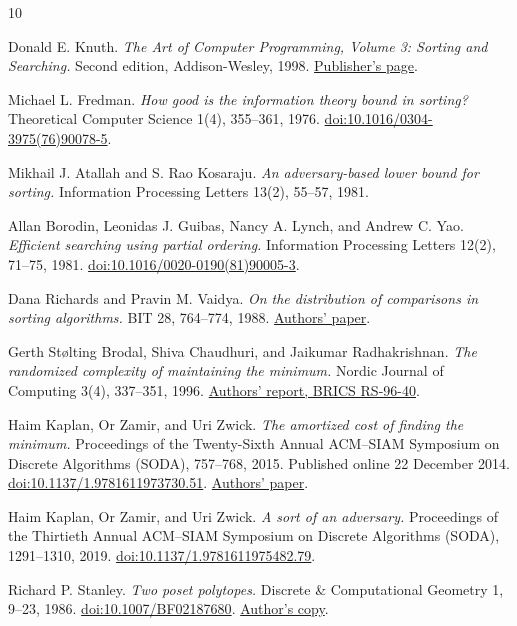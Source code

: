 \begin{thebibliography}{10}

Donald E. Knuth.
\emph{The Art of Computer Programming, Volume 3: Sorting and Searching.}
Second edition, Addison-Wesley, 1998.
\href{https://www.informit.com/store/art-of-computer-programming-volume-3-sorting-and-searching-9780201896855}{Publisher's page}.

Michael L. Fredman.
\emph{How good is the information theory bound in sorting?}
Theoretical Computer Science 1(4), 355--361, 1976.
\href{https://doi.org/10.1016/0304-3975(76)90078-5}{doi:10.1016/0304-3975(76)90078-5}.

Mikhail J. Atallah and S. Rao Kosaraju.
\emph{An adversary-based lower bound for sorting.}
Information Processing Letters 13(2), 55--57, 1981.

Allan Borodin, Leonidas J. Guibas, Nancy A. Lynch, and Andrew C. Yao.
\emph{Efficient searching using partial ordering.}
Information Processing Letters 12(2), 71--75, 1981.
\href{https://doi.org/10.1016/0020-0190(81)90005-3}{doi:10.1016/0020-0190(81)90005-3}.

Dana Richards and Pravin M. Vaidya.
\emph{On the distribution of comparisons in sorting algorithms.}
BIT 28, 764--774, 1988.
\href{https://lic225.github.io/vaidya/sorting_BIT88.pdf}{Authors' paper}.

Gerth St{\o}lting Brodal, Shiva Chaudhuri, and Jaikumar Radhakrishnan.
\emph{The randomized complexity of maintaining the minimum.}
Nordic Journal of Computing 3(4), 337--351, 1996.
\href{https://www.brics.dk/RS/96/40/BRICS-RS-96-40.pdf}{Authors' report, BRICS RS-96-40}.


Haim Kaplan, Or Zamir, and Uri Zwick.
\emph{The amortized cost of finding the minimum.}
Proceedings of the Twenty-Sixth Annual ACM--SIAM Symposium on Discrete Algorithms
(SODA), 757--768, 2015. Published online 22 December 2014.
\href{https://doi.org/10.1137/1.9781611973730.51}{doi:10.1137/1.9781611973730.51}.
\href{https://zamir.prof/pub/FindMin_OrZamir.pdf}{Authors' paper}.

Haim Kaplan, Or Zamir, and Uri Zwick.
\emph{A sort of an adversary.}
Proceedings of the Thirtieth Annual ACM--SIAM Symposium on Discrete Algorithms
(SODA), 1291--1310, 2019.
\href{https://doi.org/10.1137/1.9781611975482.79}{doi:10.1137/1.9781611975482.79}.

Richard P. Stanley.
\emph{Two poset polytopes.}
Discrete \& Computational Geometry 1, 9--23, 1986.
\href{https://doi.org/10.1007/BF02187680}{doi:10.1007/BF02187680}.
\href{https://math.mit.edu/~rstan/pubs/pubfiles/66.pdf}{Author's copy}.


\end{thebibliography}
